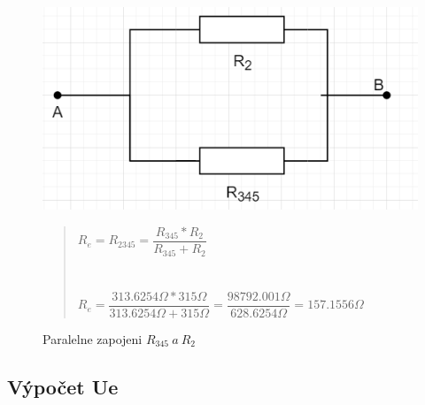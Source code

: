 \begin{figure}[H]
    \centering
    \includegraphics[scale=0.5]{picturesFor2Uloha/3.png}
    \caption{Paralelne zapojeni $R_{345} \: a \: R_2$}
    \label{fig:Paralel_resistor_R2345}
    \begin{quote}
    \centering
    $R_e = R_{2345} = \dfrac{R_{345} * R_2}{R_{345} + R_2}$ \\~\\~\\
    $R_e = \dfrac{313.6254\Omega * 315\Omega}{313.6254\Omega + 315\Omega} = \dfrac{98792.001\Omega}{628.6254\Omega} = 157.1556\Omega$
    \end{quote}
\end{figure}

\subsection{Výpočet Ue}

